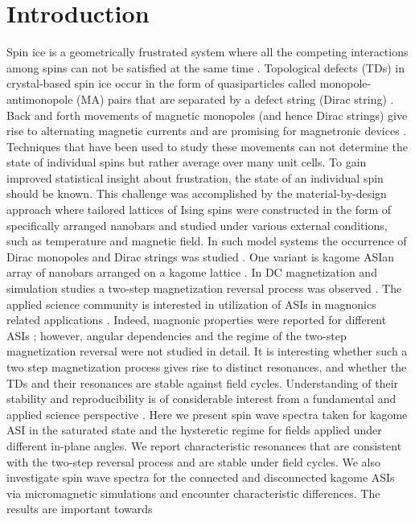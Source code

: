 \documentclass[aps,prl,preprint,showpacs,superscriptaddress,groupedaddress]{revtex4}%
\begin{document}
\maketitle
\section{Introduction}
Spin ice is a geometrically frustrated system where all the competing interactions among spins can not be satisfied at the same time \cite{mengotti2011real}.   Topological defects (TDs) in crystal-based spin ice occur in the form of quasiparticles called monopole-antimonopole (MA) pairs that are separated by a defect string  (Dirac string) \cite{jaubert2009signature,gliga2013spectral}.  Back and forth movements of magnetic monopoles (and hence Dirac strings)  give rise to alternating  \textsc{}magnetic\textsc{}  currents and are promising for magnetronic devices \cite{bramwell2009measurement}.  Techniques that have been used to study these movements can not determine the state of individual spins but rather average over many unit cells. To gain improved statistical insight about frustration, the state of an individual spin should be known. This challenge was accomplished by the material-by-design approach \cite{nisoli2013colloquium} where tailored lattices of Ising spins were constructed in the form of specifically arranged nanobars and studied under various external conditions, such as temperature and magnetic field. In such model systems the occurrence of Dirac monopoles and Dirac strings was studied \cite{mengotti2011real}. One variant  is kagome ASI\textemdash an array of nanobars arranged on a kagome lattice \cite{qi2008direct}. In DC magnetization and simulation studies a two-step magnetization reversal process was observed \cite{burn2015angular,mellado2010kagome,daunheimer2011reducing}. The applied science community is  interested in utilization of ASIs in magnonics related applications \cite{krawczyk2014review}. Indeed, magnonic properties were reported for different ASIs \cite{bhat2016magnetization,zhou2016large,jungfleisch2016dynamic}; however, angular dependencies and the regime of the two-step magnetization reversal were not studied in detail. It is interesting  whether such a two step magnetization process gives rise to distinct resonances, and whether the TDs and their resonances are stable against field cycles. Understanding of their stability and reproducibility is of considerable interest from a fundamental and applied science perspective \cite{gilbert2015ground,libal2012hysteresis,gilbert2015direct}. Here we present spin wave spectra taken for kagome ASI in the saturated state and the hysteretic regime for fields applied under different in-plane angles. We report characteristic resonances that are consistent with the two-step reversal process and are stable under field cycles. We also investigate spin wave spectra for the connected and disconnected kagome ASIs via micromagnetic simulations and encounter characteristic differences. The results are important towards 
\end{document}
